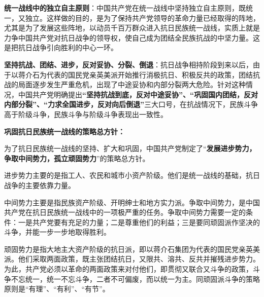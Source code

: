 \textbf{统一战线中的独立自主原则}：中国共产党在统一战线中坚持独立自主原则，既统一，又独立。这样做的目的，是为了保持共产党领导的革命力量已经取得的阵地，尤其是为了发展这些阵地，以动员千百万群众进入抗日民族统一战线，实质上就是力争中国共产党对抗日战争的领导权，使自己成为团结全民族抗战的中坚力量。这是把抗日战争引向胜利的中心一环。

\textbf{坚持抗战、团结、进步，反对妥协、分裂、倒退}{：抗日战争相持阶段到来以后，由于以蒋介石为代表的国民党亲英美派开始推行消极抗日、积极反共的政策，团结抗战的局面逐步发生严重危机，出现了中途妥协和内部分裂两大危险。针对这种情况，中国共产党明确提出}\textbf{``坚持抗战到底，反对中途妥协''、``巩固国内团结，反对内部分裂''、``力求全国进步，反对向后倒退''}{三大口号，在抗战情况下，民族斗争高于阶级斗争，民族斗争与阶级斗争表现出一致性。}

{\textbf{巩固抗日民族统一战线的策略总方针：}}

为了抗日民族统一战线的坚持、扩大和巩固，中国共产党制定了``\textbf{发展进步势力，争取中间势力，孤立顽固势力}''的策略总方针。

进步势力主要的是指工人、农民和城市小资产阶级。他们是统一战线的基础，抗日战争的主要依靠力量。{}

中间势力主要是指民族资产阶级、开明绅士和地方实力派。争取中间势力，是中国共产党在抗日民族统一战线中的一项极严重的任务。争取中间势力需要一定的条件：一是共产党要有充足的力量；二是尊重他们的利益；三是要同顽固派作坚决的斗争，并能一步一步地取得胜利。

顽固势力是指大地主大资产阶级的抗日派，即以蒋介石集团为代表的国民党亲英美派{。他们采取两面政策，既主张团结抗日，又限共、溶共、反共并摧残进步势力。为此，共产党必须以革命的两面政策来对付他们，}即贯彻又联合又斗争的政策{，斗争不忘统一，统一不忘斗争，二者不可偏废，而以统一为主。}同顽固派斗争的策略原则是``有理''、``有利''、``有节''{。}{}
